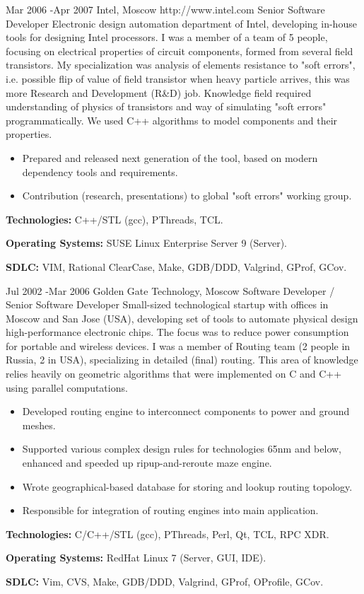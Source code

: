 \documentclass[10pt]{article} %
\begin{document}
\job
{Mar 2006 -}{Apr 2007}
{Intel, Moscow}
{http://www.intel.com}
{Senior Software Developer}
{Electronic design automation department of Intel, developing in-house tools for designing Intel processors.
I was a member of a team of 5 people, focusing on electrical properties of circuit components, formed from several 
field transistors. My specialization was analysis of elements resistance to "soft errors", i.e. possible
flip of value of field transistor when heavy particle arrives, this was more Research and Development (R\&D) job.
Knowledge field required understanding of physics of transistors and way of simulating "soft errors" programmatically.
We used C++ algorithms to model components and their properties.}
{\begin{itemize}
\item{Prepared and released next generation of the tool, based on modern dependency tools and requirements.}
\item{Contribution (research, presentations) to global "soft errors" working group.}
\end{itemize}}
{\rule{0mm}{5mm}\textbf{Technologies:} C++/STL (gcc), PThreads, TCL.\\
\rule{0mm}{5mm}\textbf{Operating Systems:} SUSE Linux Enterprise Server 9 (Server).\\
\rule{0mm}{5mm}\textbf{SDLC:} VIM, Rational ClearCase, Make, GDB/DDD, Valgrind, GProf, GCov.
}


\job
{Jul 2002 -}{Mar 2006}
{Golden Gate Technology, Moscow}
{}
{Software Developer / Senior Software Developer}
{Small-sized technological startup with offices in Moscow and San Jose (USA), developing set of tools
to automate physical design high-performance electronic chips. The focus was to reduce power consumption
for portable and wireless devices. I was a member of Routing team (2 people in Russia, 2 in USA),
specializing in detailed (final) routing. This area of knowledge relies heavily on geometric algorithms
that were implemented on C and C++ using parallel computations.}
{\begin{itemize}
\item{Developed routing engine to interconnect components to power and ground meshes.}
\item{Supported various complex design rules for technologies 65nm and below, enhanced and speeded up ripup-and-reroute maze engine.}
\item{Wrote geographical-based database for storing and lookup routing topology.}
\item{Responsible for integration of routing engines into main application.}
\end{itemize}}
{\rule{0mm}{5mm}\textbf{Technologies:} C/C++/STL (gcc), PThreads, Perl, Qt, TCL, RPC XDR.\\
\rule{0mm}{5mm}\textbf{Operating Systems:} RedHat Linux 7 (Server, GUI, IDE).\\
\rule{0mm}{5mm}\textbf{SDLC:} Vim, CVS, Make, GDB/DDD, Valgrind, GProf, OProfile, GCov.
}
\end{document}
